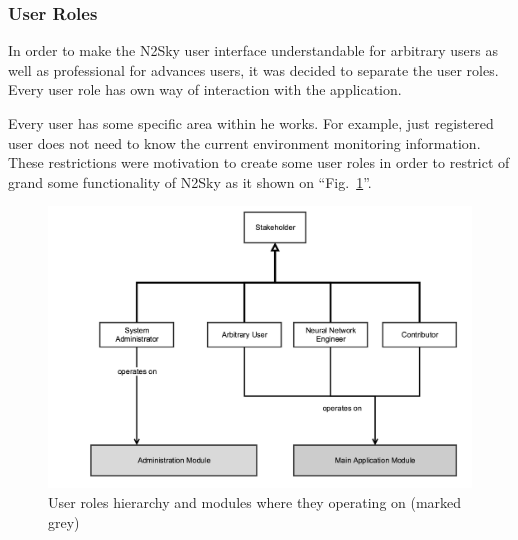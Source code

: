 \subsubsection{User Roles}\label{User Roles}

In order to make the N2Sky user interface understandable for arbitrary users as well as professional for advances users, it was decided to separate the user roles. Every user role has own way of interaction with the application.

Every user has some specific area within he works. For example, just registered user does not need to know the current environment monitoring information. These restrictions were motivation to create some user roles in order to restrict of grand some functionality of N2Sky as it shown on ``Fig.~\ref{fig:userroles}''.

\begin{figure}[htbp]
\begin{center}
  \includegraphics[width=\linewidth]{components/4/pics/users.png}
  \caption{User roles hierarchy and modules where they operating on (marked grey)}
  \label{fig:userroles}
\end{center}
\end{figure}

